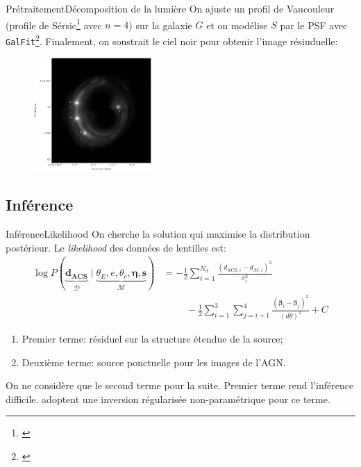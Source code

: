 \documentclass{beamer}
\begin{document}
\begin{frame}{Prétraitement}{Décomposition de la lumière}
        On ajuste un profil de 
        Vaucouleur (profile de Sérsic\footnote{\citet{Sersic1963}} avec $n=4$)
        sur la galaxie $G$ et on 
        modélise $S$ par le PSF avec \texttt{GalFit}\footnote{\citet{Peng2002}}. Finalement, 
        on soustrait le ciel noir pour obtenir l'image résiuduelle:
        \begin{figure}[H]
                \centering
                \includegraphics[width=0.4\textwidth]{residual}
        \end{figure}
        
\end{frame}


\subsection{Inférence}

\begin{frame}{Inférence}{Likelihood}
        On cherche la solution qui maximise la distribution postérieur. Le 
        \textit{likelihood} des données de lentilles est:
        \begin{align}\label{eq:Likelihood} 
                \log P(\underbrace{\mathbf{d_{\text{ACS}}}}_{\mathcal{D}}\mid 
                \underbrace{\theta_E, e, \theta_c, \boldsymbol{ \eta}, \mathbf{s}
                }_{\mathcal{M}} )  
        &= -\frac{1}{2}\sum_{i=1}^{N_d} \frac{(d_{\text{ACS},i} 
        - d_{\mathcal{M}, i})^2}{\sigma^2_i}
        \\\nonumber
        &\hspace{1cm}-\frac{1}{2}\sum_{i=1}^{3}\sum_{j=i+1}^{4} \frac{
        (\boldsymbol{\beta}_i - \boldsymbol{\beta}_j  )^2}{(d\theta)^2} + C 
        \end{align} 
\begin{enumerate}
        \item Premier terme: résiduel sur la structure étendue de la source;
        \item Deuxième terme: source ponctuelle pour les images de l'AGN. 
\end{enumerate}
On ne considère que le second terme pour la suite. Premier terme rend l'inférence difficile.
\citet{Suyu2013} adoptent une inversion régularisée non-paramétrique pour ce terme.
\end{frame}
\end{document}
